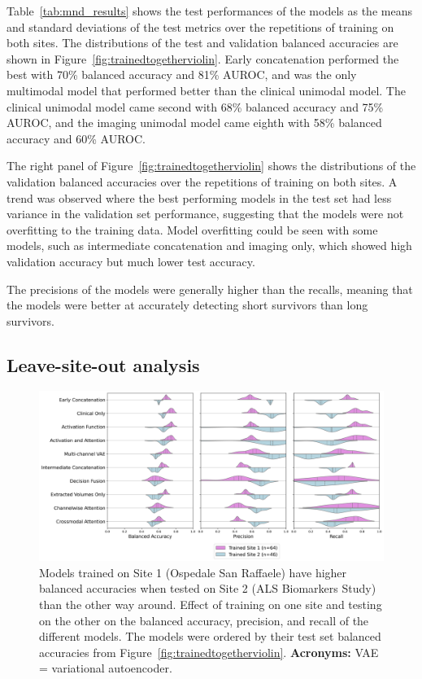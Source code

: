 Table~\ref{tab:mnd_results} shows the test performances of the models as the means and standard deviations of the test metrics over the repetitions of training on both sites.
The distributions of the test and validation balanced accuracies are shown in Figure~\ref{fig:trainedtogetherviolin}.
Early concatenation performed the best with 70\% balanced accuracy and 81\% AUROC, and was the only multimodal model that performed better than the clinical unimodal model.
The clinical unimodal model came second with 68\% balanced accuracy and 75\% AUROC, and the imaging unimodal model came eighth with 58\% balanced accuracy and 60\% AUROC.

The right panel of Figure~\ref{fig:trainedtogetherviolin} shows the distributions of the validation balanced accuracies over the repetitions of training on both sites.
A trend was observed where the best performing models in the test set had less variance in the validation set performance, suggesting that the models were not overfitting to the training data.
Model overfitting could be seen with some models, such as intermediate concatenation and imaging only, which showed high validation accuracy but much lower test accuracy.

The precisions of the models were generally higher than the recalls, meaning that the models were better at accurately detecting short survivors than long survivors.

\subsection{Leave-site-out analysis}

\begin{figure}
    \centering
    \hspace*{-2cm}
    \includegraphics[width=1.2\textwidth]{figures/violinplot_site_effect}
    \caption[Effect of training on one site and testing on the other on the balanced accuracy, precision, and recall of the different models.]{Models trained on Site 1 (Ospedale San Raffaele) have higher balanced accuracies when tested on Site 2 (ALS Biomarkers Study) than the other way around. Effect of training on one site and testing on the other on the balanced accuracy, precision, and recall of the different models. The models were ordered by their test set balanced accuracies from Figure~\ref{fig:trainedtogetherviolin}. \textbf{Acronyms:} VAE = variational autoencoder.}
    \label{fig:site_effect}
\end{figure}


